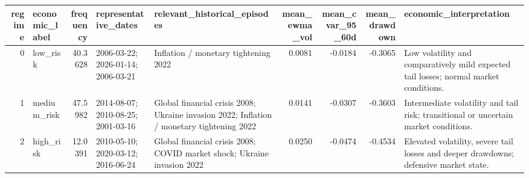 \begin{tabular}{rlrllrrrl}
\toprule
regime & economic_label & frequency & representative_dates & relevant_historical_episodes & mean_ewma_vol & mean_cvar_95_60d & mean_drawdown & economic_interpretation \\
\midrule
0 & low_risk & 40.3628 & 2006-03-22; 2026-01-14; 2006-03-21 & Inflation / monetary tightening 2022 & 0.0081 & -0.0184 & -0.3065 & Low volatility and comparatively mild expected tail losses; normal market conditions. \\
1 & medium_risk & 47.5982 & 2014-08-07; 2010-08-25; 2001-03-16 & Global financial crisis 2008; Ukraine invasion 2022; Inflation / monetary tightening 2022 & 0.0141 & -0.0307 & -0.3603 & Intermediate volatility and tail risk; transitional or uncertain market conditions. \\
2 & high_risk & 12.0391 & 2010-05-10; 2020-03-12; 2016-06-24 & Global financial crisis 2008; COVID market shock; Ukraine invasion 2022 & 0.0250 & -0.0474 & -0.4534 & Elevated volatility, severe tail losses and deeper drawdowns; defensive market state. \\
\bottomrule
\end{tabular}
